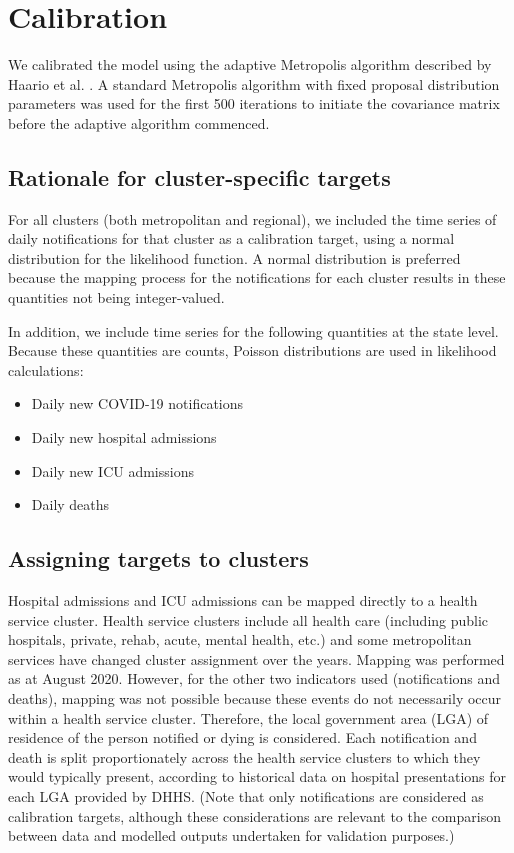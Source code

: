 \section{Calibration}

We calibrated the model using the adaptive Metropolis algorithm described by Haario et al. \cite{RN4}. A standard Metropolis algorithm with fixed proposal distribution parameters was used for the first 500 iterations to initiate the covariance matrix before the adaptive algorithm commenced.

\subsection{Rationale for cluster-specific targets}
For all clusters (both metropolitan and regional), we included the time series of daily notifications for that cluster as a calibration target, using a normal distribution for the likelihood function. A normal distribution is preferred because the mapping process for the notifications for each cluster results in these quantities not being integer-valued.

In addition, we include time series for the following quantities at the state level. Because these quantities are counts, Poisson distributions are used in likelihood calculations:
\begin{itemize}
    \item Daily new COVID-19 notifications
    \item Daily new hospital admissions
    \item Daily new ICU admissions
    \item Daily deaths
\end{itemize}

\subsection{Assigning targets to clusters}
Hospital admissions and ICU admissions can be mapped directly to a health service cluster. Health service clusters include all health care (including public hospitals, private, rehab, acute, mental health, etc.) and some metropolitan services have changed cluster assignment over the years. Mapping was performed as at August 2020.  However, for the other two indicators used (notifications and deaths), mapping was not possible because these events do not necessarily occur within a health service cluster. Therefore, the local government area (LGA) of residence of the person notified or dying is considered. Each notification and death is split proportionately across the health service clusters to which they would typically present, according to historical data on hospital presentations for each LGA provided by DHHS. (Note that only notifications are considered as calibration targets, although these considerations are relevant to the comparison between data and modelled outputs undertaken for validation purposes.)


